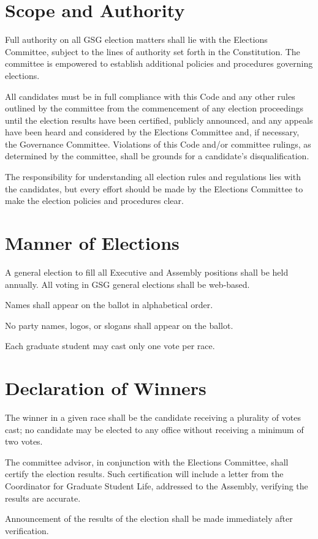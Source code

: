 \section{Scope and Authority}
\begin{bylaws-number}
  \item Full authority on all GSG election matters shall lie with the Elections Committee, subject to the lines of authority set forth in the Constitution. The committee is empowered to establish additional policies and procedures governing elections.
  \item All candidates must be in full compliance with this Code and any other rules outlined by the committee from the commencement of any election proceedings until the election results have been certified, publicly announced, and any appeals have been heard and considered by the Elections Committee and, if necessary, the Governance Committee. Violations of this Code and/or committee rulings, as determined by the committee, shall be grounds for a candidate’s disqualification.
  \item The responsibility for understanding all election rules and regulations lies with the candidates, but every effort should be made by the Elections Committee to make the election policies and procedures clear.
\end{bylaws-number}

\section{Manner of Elections}
\begin{bylaws-number}
  \item A general election to fill all Executive and Assembly positions shall be held annually. All voting in GSG general elections shall be web-based.
  \item Names shall appear on the ballot in alphabetical order.
  \item No party names, logos, or slogans shall appear on the ballot.
  \item Each graduate student may cast only one vote per race.
\end{bylaws-number}

\section{Declaration of Winners}
\begin{bylaws-number}
  \item The winner in a given race shall be the candidate receiving a plurality of votes cast; no candidate may be elected to any office without receiving a minimum of two votes.
  \item The committee advisor, in conjunction with the Elections Committee, shall certify the election results. Such certification will include a letter from the Coordinator for Graduate Student Life, addressed to the Assembly, verifying the results are accurate.
  \item Announcement of the results of the election shall be made immediately after verification.
\end{bylaws-number}

